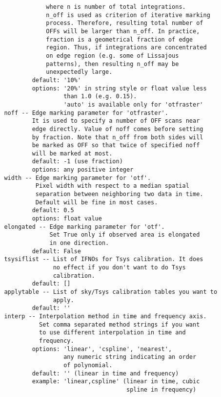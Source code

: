 \begin{verbatim}
                     where n is number of total integrations.
                     n_off is used as criterion of iterative marking
                     process. Therefore, resulting total number of 
                     OFFs will be larger than n_off. In practice,
                     fraction is a geometrical fraction of edge
                     region. Thus, if integrations are concentrated
                     on edge region (e.g. some of Lissajous
                     patterns), then resulting n_off may be 
                     unexpectedly large.
                 default: '10%'
                 options: '20%' in string style or float value less 
                          than 1.0 (e.g. 0.15).
                          'auto' is available only for 'otfraster' 
         noff -- Edge marking parameter for 'otfraster'.
                 It is used to specify a number of OFF scans near 
                 edge directly. Value of noff comes before setting 
                 by fraction. Note that n_off from both sides will 
                 be marked as OFF so that twice of specified noff 
                 will be marked at most.
                 default: -1 (use fraction)
                 options: any positive integer
         width -- Edge marking parameter for 'otf'.
                  Pixel width with respect to a median spatial 
                  separation between neighboring two data in time.
                  Default will be fine in most cases.
                 default: 0.5
                 options: float value
         elongated -- Edge marking parameter for 'otf'.
                      Set True only if observed area is elongated 
                      in one direction.
                 default: False
         tsysiflist -- List of IFNOs for Tsys calibration. It does 
                       no effect if you don't want to do Tsys 
                       calibration.
                 default: []
         applytable -- List of sky/Tsys calibration tables you want to 
                       apply.
                 default: ''
         interp -- Interpolation method in time and frequency axis. 
                   Set comma separated method strings if you want 
                   to use different interpolation in time and 
                   frequency. 
                 options: 'linear', 'cspline', 'nearest', 
                          any numeric string indicating an order 
                          of polynomial.
                 default: '' (linear in time and frequency)
                 example: 'linear,cspline' (linear in time, cubic 
                                            spline in frequency)

\end{verbatim}
